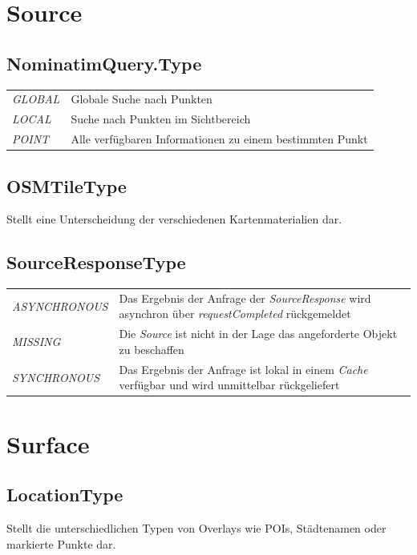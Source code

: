 \documentclass[10pt]{scrreprt}
\begin{document}
\section{Source}

\subsection*{NominatimQuery.Type}
\begin{tabular}{p{4cm} p{11cm}}
\textit{GLOBAL} & Globale Suche nach Punkten \\
\textit{LOCAL} & Suche nach Punkten im Sichtbereich \\
\textit{POINT} & Alle verfügbaren Informationen zu einem bestimmten Punkt \\
\end{tabular}

\vspace{5mm}
\subsection*{OSMTileType}
Stellt eine Unterscheidung der verschiedenen Kartenmaterialien dar.

\vspace{5mm}
\subsection*{SourceResponseType}
\begin{tabular}{p{4cm} p{11cm}}
\textit{ASYNCHRONOUS} & Das Ergebnis der Anfrage der \textit{SourceResponse} wird asynchron über \textit{requestCompleted} rückgemeldet\\
\textit{MISSING} & Die \textit{Source} ist nicht in der Lage das angeforderte Objekt zu beschaffen\\
\textit{SYNCHRONOUS} & Das Ergebnis der Anfrage ist lokal in einem \textit{Cache} verfügbar und wird unmittelbar rückgeliefert \\
\end{tabular}


\vspace{5mm}
\section{Surface}
\subsection*{LocationType}
Stellt die unterschiedlichen Typen von Overlays wie POIs, Städtenamen oder markierte Punkte dar.
\end{document}
